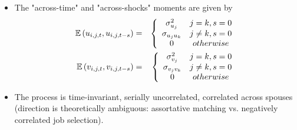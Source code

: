 \documentclass[notes=show]{beamer}
\begin{document}
\begin{frame}%


\begin{itemize}
\item The "across-time" and "across-shocks" moments are given by%
\begin{eqnarray}
\mathbb{E}\left( u_{i,j,t},u_{i,j,t-s}\right) &=&\left\{ 
\begin{array}{cc}
\sigma _{u_{j}}^{2} & j=k,s=0 \\ 
\sigma _{u_{j}u_{k}} & j\neq k,s=0 \\ 
0 & otherwise%
\end{array}%
\right. \\
\mathbb{E}\left( v_{i,j,t},v_{i,j,t-s}\right) &=&\left\{ 
\begin{array}{cc}
\sigma _{v_{j}}^{2} & j=k,s=0 \\ 
\sigma _{v_{j}v_{k}} & j\neq k,s=0 \\ 
0 & otherwise%
\end{array}%
\right.  \notag
\end{eqnarray}

\item The process is time-invariant, serially uncorrelated, correlated
across spouses (direction is theoretically ambiguous: assortative matching
vs. negatively correlated job selection).
\end{itemize}

\transboxout%
\end{frame}%

\bigskip
\end{document}
